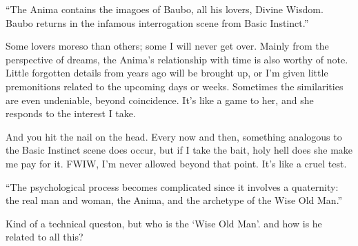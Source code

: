 \begin{footnotesize}
\begin{sffamily}
“The Anima contains the imagoes of Baubo, all his lovers, Divine Wisdom. Baubo returns in the infamous interrogation scene from Basic Instinct.”

Some lovers moreso than others; some I will never get over. Mainly from the perspective of dreams, the Anima's relationship with time is also worthy of note. Little forgotten details from years ago will be brought up, or I'm given little premonitions related to the upcoming days or weeks. Sometimes the similarities are even undeniable, beyond coincidence. It's like a game to her, and she responds to the interest I take.

And you hit the nail on the head. Every now and then, something analogous to the Basic Instinct scene does occur, but if I take the bait, holy hell does she make me pay for it. FWIW, I'm never allowed beyond that point. It's like a cruel test.

“The psychological process becomes complicated since it involves a quaternity: the real man and woman, the Anima, and the archetype of the Wise Old Man.”

Kind of a technical queston, but who is the `Wise Old Man'. and how is he related to all this?


\hfill


\end{sffamily}\end{footnotesize}
